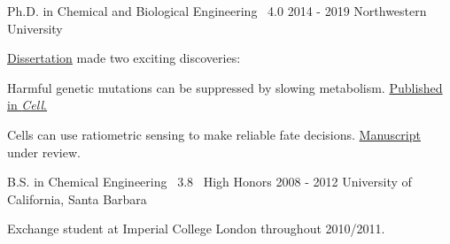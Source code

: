 

\begin{cventries}

  \cventrynew
	{Ph.D. in Chemical and Biological Engineering \bullet\ 4.0} %
	{2014 - 2019} %
	{Northwestern University} %
    {\href{https://search.proquest.com/openview/75781af182db5bcf643756c762aa4ff4/1?pq-origsite=gscholar&cbl=18750&diss=y}
      	   {Dissertation} made two exciting discoveries: \newline
      \vspace{4.0mm}
      \begin{cvitems} 
      	\item {Harmful genetic mutations can be suppressed by slowing metabolism. \href{https://doi.org/10.1016/j.cell.2019.06.023}{Published in \emph{Cell}.}}
		 \item {Cells can use ratiometric sensing to make reliable fate decisions. \href{https://doi.org/10.1101/430744}{Manuscript} under review.} 
      \end{cvitems}      	  
    }
    
  \cventrynew
	{B.S. in Chemical Engineering \bullet\ 3.8 \bullet\ High Honors} 	
	{2008 - 2012} 	
	{University of California, Santa Barbara}    
    {
      \begin{cvitems} %
      	\item {Exchange student at Imperial College London throughout 2010/2011.}      	
      \end{cvitems}
    }

\end{cventries}
